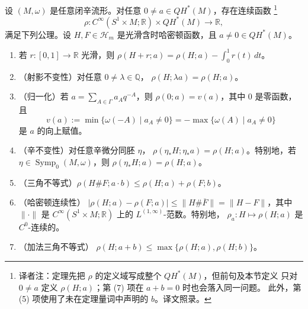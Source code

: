 \begin{theorem}
\label{thm:21-spectral-axioms}
设 $(M,\omega)$ 是任意闭辛流形。对任意 $0\neq a\in QH^*(M)$，存在连续函数
\footnote{译者注：定理先把 $\rho$ 的定义域写成整个 $QH^*(M)$，但前句及本节定义
只对 $0\neq a$ 定义 $\rho(H;a)$；第 (7) 项在 $a+b=0$ 时也会落入同一问题。
此外，第 (5) 项使用了未在定理量词中声明的 $b$。译文照录。}
\[
 \rho:C^\infty(S^1\times M;\mathbb R)\times QH^*(M)\longrightarrow\mathbb R,
\]
满足下列公理。设 $H,F\in\mathcal H_m$ 是光滑含时哈密顿函数，且
$a\neq0\in QH^*(M)$。
\begin{enumerate}[label=(\arabic*)]
 \item 若 $r:[0,1]\to\mathbb R$ 光滑，则
 $\rho(H+r;a)=\rho(H;a)-\int_0^1r(t)\,dt$。
 \item （射影不变性）对任意 $0\neq\lambda\in\mathbb Q$，
 $\rho(H;\lambda a)=\rho(H;a)$。
 \item （归一化）若 $a=\sum_{A\in\Gamma}a_Aq^{-A}$，则
 $\rho(0;a)=v(a)$，其中 $0$ 是零函数，且
 \[
  v(a):=\min\{\omega(-A)\mid a_A\neq0\}
  =-\max\{\omega(A)\mid a_A\neq0\}
 \]
 是 $a$ 的向上赋值。
 \item （辛不变性）对任意辛微分同胚 $\eta$，
 $\rho(\eta_*H;\eta_*a)=\rho(H;a)$。特别地，若
 $\eta\in\operatorname{Symp}_0(M,\omega)$，则 $\rho(\eta_*H;a)=\rho(H;a)$。
 \item （三角不等式）$\rho(H\#F;a\cdot b)\leq\rho(H;a)+\rho(F;b)$。
 \item （哈密顿连续性）
 $|\rho(H;a)-\rho(F;a)|\leq\lVert H\#\overline F\rVert
 =\lVert H-F\rVert$，其中 $\lVert\cdot\rVert$ 是
 $C^\infty(S^1\times M;\mathbb R)$ 上的 $L^{(1,\infty)}$-范数。特别地，
 $\rho_a:H\mapsto\rho(H;a)$ 是 $C^0$-连续的。
 \item （加法三角不等式）
 $\rho(H;a+b)\leq\max\{\rho(H;a),\rho(H;b)\}$。
\end{enumerate}
\end{theorem}

